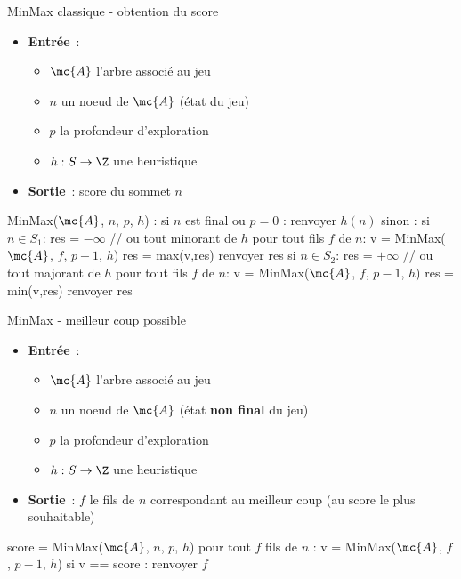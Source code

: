 \begin{adjustwidth}{-3cm}{-3cm}
\begin{implementation}{MinMax classique - obtention du score}
    \begin{itemize}
        \item \textbf{Entrée}~: \begin{itemize}
            \item $\mc{A}$ l'arbre associé au jeu
            \item $n$ un noeud de $\mc{A}$ (état du jeu)
            \item $p$ la profondeur d'exploration
            \item $h:S\to \Z$ une heuristique
        \end{itemize}
        \item \textbf{Sortie}~: score du sommet $n$ 
    \end{itemize}
    \begin{lstLNat}
    MinMax($\mc{A}$, $n$, $p$, $h$) :
        si $n$ est final ou $p=0$ :
            renvoyer $h(n)$
        sinon :
            si $n \in S_1$:
                res = $-\infty$ // ou tout minorant de $h$
                pour tout fils $f$ de $n$:
                    v = MinMax($\mc{A}$, $f$, $p-1$, $h$)
                    res = max(v,res)
                renvoyer res
            si $n \in S_2$:
                res = $+\infty$ // ou tout majorant de $h$
                pour tout fils $f$ de $n$:
                    v = MinMax($\mc{A}$, $f$, $p-1$, $h$)
                    res = min(v,res)
                renvoyer res
    \end{lstLNat}
\end{implementation}

\begin{implementation}{MinMax - meilleur coup possible}
    \begin{itemize}
        \item \textbf{Entrée}~: \begin{itemize}
            \item $\mc{A}$ l'arbre associé au jeu
            \item $n$ un noeud de $\mc{A}$ (état \textbf{non final} du jeu)
            \item $p$ la profondeur d'exploration
            \item $h:S\to \Z$ une heuristique
        \end{itemize}
        \item \textbf{Sortie}~: $f$ le fils de $n$ correspondant au meilleur coup (au score le plus souhaitable)
    \end{itemize}
    \begin{lstLNat}
    score = MinMax($\mc{A}$, $n$, $p$, $h$)
    pour tout $f$ fils de $n$ :
        v = MinMax($\mc{A}$, $f$, $p-1$, $h$)
        si v == score :
        renvoyer $f$
    \end{lstLNat}
\end{implementation}


\end{adjustwidth}

